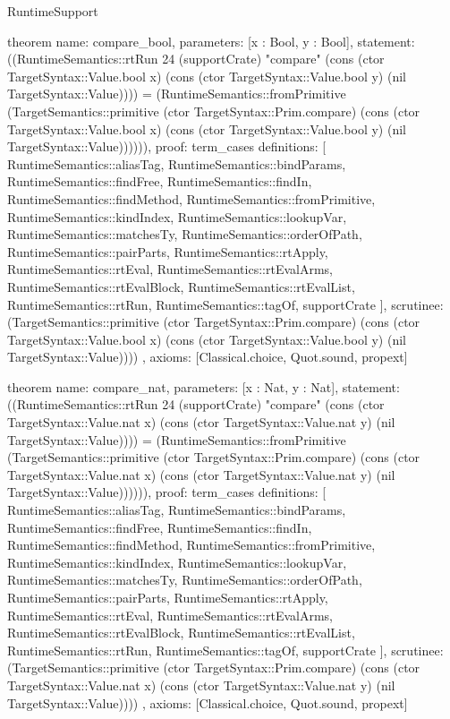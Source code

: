 \begin{lexlean}{RuntimeSupport}
\begin{semanticmodule}
theorem{
  name: compare_bool,
  parameters: [x : Bool, y : Bool],
  statement: ((RuntimeSemantics::rtRun 24 (supportCrate) "compare" (cons (ctor TargetSyntax::Value.bool x) (cons (ctor TargetSyntax::Value.bool y) (nil TargetSyntax::Value)))) = (RuntimeSemantics::fromPrimitive (TargetSemantics::primitive (ctor TargetSyntax::Prim.compare) (cons (ctor TargetSyntax::Value.bool x) (cons (ctor TargetSyntax::Value.bool y) (nil TargetSyntax::Value)))))),
  proof: term_cases{
    definitions: [
      RuntimeSemantics::aliasTag,
      RuntimeSemantics::bindParams,
      RuntimeSemantics::findFree,
      RuntimeSemantics::findIn,
      RuntimeSemantics::findMethod,
      RuntimeSemantics::fromPrimitive,
      RuntimeSemantics::kindIndex,
      RuntimeSemantics::lookupVar,
      RuntimeSemantics::matchesTy,
      RuntimeSemantics::orderOfPath,
      RuntimeSemantics::pairParts,
      RuntimeSemantics::rtApply,
      RuntimeSemantics::rtEval,
      RuntimeSemantics::rtEvalArms,
      RuntimeSemantics::rtEvalBlock,
      RuntimeSemantics::rtEvalList,
      RuntimeSemantics::rtRun,
      RuntimeSemantics::tagOf,
      supportCrate
    ],
    scrutinee: (TargetSemantics::primitive (ctor TargetSyntax::Prim.compare) (cons (ctor TargetSyntax::Value.bool x) (cons (ctor TargetSyntax::Value.bool y) (nil TargetSyntax::Value))))
  },
  axioms: [Classical.choice, Quot.sound, propext]
}

theorem{
  name: compare_nat,
  parameters: [x : Nat, y : Nat],
  statement: ((RuntimeSemantics::rtRun 24 (supportCrate) "compare" (cons (ctor TargetSyntax::Value.nat x) (cons (ctor TargetSyntax::Value.nat y) (nil TargetSyntax::Value)))) = (RuntimeSemantics::fromPrimitive (TargetSemantics::primitive (ctor TargetSyntax::Prim.compare) (cons (ctor TargetSyntax::Value.nat x) (cons (ctor TargetSyntax::Value.nat y) (nil TargetSyntax::Value)))))),
  proof: term_cases{
    definitions: [
      RuntimeSemantics::aliasTag,
      RuntimeSemantics::bindParams,
      RuntimeSemantics::findFree,
      RuntimeSemantics::findIn,
      RuntimeSemantics::findMethod,
      RuntimeSemantics::fromPrimitive,
      RuntimeSemantics::kindIndex,
      RuntimeSemantics::lookupVar,
      RuntimeSemantics::matchesTy,
      RuntimeSemantics::orderOfPath,
      RuntimeSemantics::pairParts,
      RuntimeSemantics::rtApply,
      RuntimeSemantics::rtEval,
      RuntimeSemantics::rtEvalArms,
      RuntimeSemantics::rtEvalBlock,
      RuntimeSemantics::rtEvalList,
      RuntimeSemantics::rtRun,
      RuntimeSemantics::tagOf,
      supportCrate
    ],
    scrutinee: (TargetSemantics::primitive (ctor TargetSyntax::Prim.compare) (cons (ctor TargetSyntax::Value.nat x) (cons (ctor TargetSyntax::Value.nat y) (nil TargetSyntax::Value))))
  },
  axioms: [Classical.choice, Quot.sound, propext]
}


\end{semanticmodule}
\end{lexlean}
